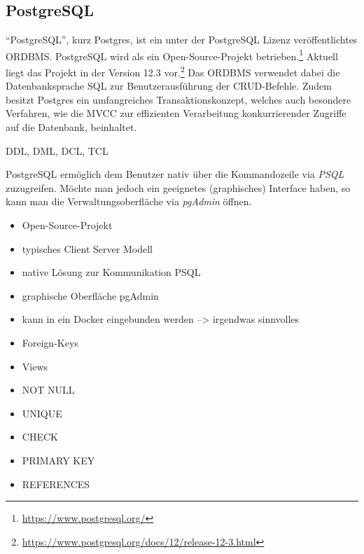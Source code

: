\subsection{PostgreSQL}
\label{ssec:PostgreSQL}

\enquote{PostgreSQL}, kurz Postgres, ist ein unter der PostgreSQL Lizenz\autocite{rf-psqllicense} veröffentlichtes \ac{ORDBMS}.
PostgreSQL wird als ein Open-Source-Projekt betrieben.\footnote{\url{https://www.postgresql.org/}} 
Aktuell liegt das Projekt in der Version 12.3 vor.\footnote{\url{https://www.postgresql.org/docs/12/release-12-3.html}} 
Das \ac{ORDBMS} verwendet dabei die Datenbanksprache \ac{SQL} zur Benutzerausführung der \ac{CRUD}-Befehle.%
Zudem besitzt Postgres ein umfangreiches Transaktionskonzept, welches auch besondere Verfahren, wie die \ac*{MVCC} zur effizienten Verarbeitung konkurrierender Zugriffe auf die Datenbank, beinhaltet.

\ac{DDL}, \ac{DML}, \ac{DCL}, \ac{TCL}

PostgreSQL ermöglich dem Benutzer nativ über die Kommandozeile via \emph{PSQL} zuzugreifen.
Möchte man jedoch ein geeignetes (graphisches) Interface haben, so kann man die Verwaltungsoberfläche via \emph{pgAdmin} öffnen. 



\begin{itemize}
    \item Open-Source-Projekt
    \item typisches Client Server Modell
    \item native Lösung zur Kommunikation PSQL
    \item graphische Oberfläche pgAdmin 
    \item kann in ein Docker eingebunden werden --> irgendwas sinnvolles 
\end{itemize}

\begin{itemize}
    \item Foreign-Keys
    \item Views
    \item NOT NULL
    \item UNIQUE
    \item CHECK
    \item PRIMARY KEY
    \item REFERENCES
\end{itemize}

